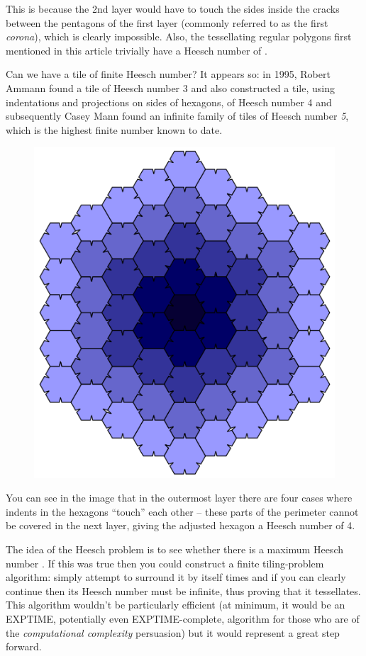 This is because the 2nd layer would have to touch the sides inside the
cracks between the pentagons of the first layer (commonly referred to as
the first \emph{corona}), which is clearly impossible. Also, the
tessellating regular polygons first mentioned in this article trivially
have a Heesch number of .

Can we have a tile of finite Heesch number? It appears so: in 1995,
Robert Ammann found a tile of Heesch number 3 and also constructed a
tile, using indentations and projections on sides of hexagons, of Heesch
number 4 and subsequently Casey Mann found an infinite family of tiles
of Heesch number \emph{5}, which is the highest finite number known to
date.

\begin{figure}[htbp]
\centering
\includegraphics{image_9.png}
\caption{}
\end{figure}

You can see in the image that in the outermost layer there are four
cases where indents in the hexagons ``touch'' each other -- these parts
of the perimeter cannot be covered in the next layer, giving the
adjusted hexagon a Heesch number of 4.

The idea of the Heesch problem is to see whether there is a maximum
Heesch number . If this was true then you could construct a finite
tiling-problem algorithm: simply attempt to surround it by itself times
and if you can clearly continue then its Heesch number must be infinite,
thus proving that it tessellates. This algorithm wouldn't be
particularly efficient (at minimum, it would be an EXPTIME, potentially
even EXPTIME-complete, algorithm for those who are of the
\emph{computational complexity} persuasion) but it would represent a
great step forward.

